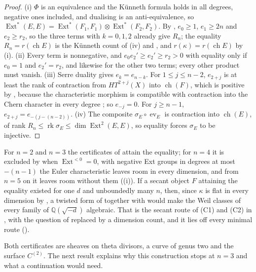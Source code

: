 \documentclass[11pt,reqno]{amsart}
\theoremstyle{plain}
\theoremstyle{definition}
\theoremstyle{remark}
\newcommand{\QQ}{\mathbb{Q}}
\DeclareMathOperator{\ch}{ch}
\DeclareMathOperator{\Ext}{Ext}
\begin{document}
\begin{proof}
(i) $\Phi$ is an equivalence and the K\"unneth formula holds in all degrees,
negative ones included, and dualising is an anti-equivalence, so
$\Ext^{*}(E,E)=\Ext^{*}(F_{1},F_{1})\otimes\Ext^{*}(F_{2},F_{2})$. By
, $e_{0}\ge1$, $e_{1}\ge2n$ and $e_{2}\ge r_{2}$, so the
three terms with $k=0,1,2$ already give $R_{n}$; the equality $R_{n}=r(\ch E)$ is
the K\"unneth count of (iv) and , and
$r(\kappa)=r(\ch E)$ by (i). (ii) Every term is nonnegative,
and $e_{0}e_{2}'\ge e_{2}'\ge r_{2}>0$ with equality only if $e_{0}=1$ and
$e_{2}'=r_{2}$, and likewise for the other two terms; every other product must
vanish. (iii) Serre duality gives $e_{k}=e_{n-k}$. For $1\le j\le n-2$, $e_{2+j}$ is
at least the rank of contraction from $HT^{2+j}(X)$ into $\ch(F)$, which is
positive by , because the characteristic morphism is
compatible with contraction into the Chern character in every degree
\cite{CRV12}; so $e_{-j}=0$. For $j\ge n-1$, $e_{2+j}=e_{-(j-(n-2))}$.
(iv) The composite $\sigma_{E}\circ\operatorname{ev}_{E}$
is contraction into $\ch(E)$, of rank $R_{n}\le\operatorname{rk}\sigma_{E}\le
\dim\Ext^{2}(E,E)$, so equality forces $\sigma_{E}$ to be injective.
\end{proof}

For $n=2$ and $n=3$ the certificates of  attain the
equality; for $n=4$ it is excluded by  when
$\Ext^{<0}=0$, with negative Ext groups in degrees at most $-(n-1)$ the
Euler characteristic leaves room in every dimension, and from $n=5$ on it
leaves room without them ((i)). If a secant object $F$
attaining the equality existed for one $d$ and unboundedly many $n$, then,
since $\kappa$ is flat in every dimension by
, a twisted form of  together with
\cite[Proposition~2.13]{paperIII} would make the Weil classes of every family of
$\QQ(\sqrt{-d})$ algebraic. That is the secant route of (C1) and (C2) in
\cite[Section~2.5]{paperIII}, with the question of \cite{Mar25b} replaced by a
dimension count, and it lies off every minimal route (\cite[Theorem~2.70(iv)]{paperIII}).

Both certificates are sheaves on theta divisors, a curve of genus two and the
surface $C^{(2)}$. The next result explains why this construction stops at
$n=3$ and what a continuation would need.
\end{document}
